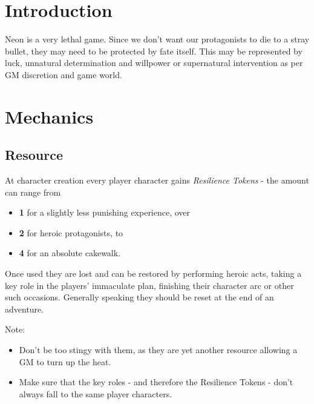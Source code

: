 \documentclass[12pt,a4paper,openany,usenames,dvipsnames]{book}
\begin{document}
	
	
	\chapter{Introduction}
	Neon is a very lethal game. Since we don't want our protagonists to die to a stray bullet, they may need to be protected by fate itself. 
	This may be represented by luck, unnatural determination and willpower or supernatural intervention as per GM discretion and game world.

	\chapter{Mechanics}
	\section{Resource}
	At character creation every player character gains \emph{Resilience Tokens} - the amount can range from
	\begin{itemize}
		\item \textbf{1} for a slightly less punishing experience, over
		\item \textbf{2} for heroic protagonists, to
		\item \textbf{4} for an absolute cakewalk.
	\end{itemize}
	Once used they are lost and can be restored by performing heroic acts, taking a key role in the players' immaculate plan, finishing their character arc or other such occasions. Generally speaking they should be reset at the end of an adventure.
	\par
	Note: \vspace{-6mm}
	\begin{itemize}
		\setlength\itemsep{-8mm}
		\item Don't be too stingy with them, as they are yet another resource allowing a GM to turn up the heat.
		\item Make sure that the key roles - and therefore the Resilience Tokens - don't always fall to the same player characters.
	\end{itemize}

	\pagebreak
\end{document}
